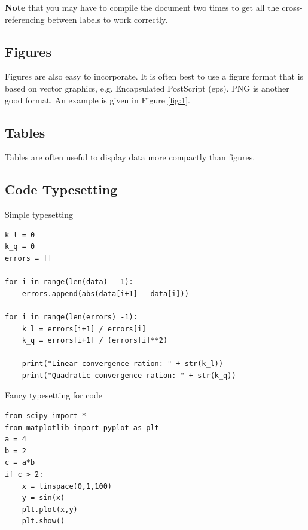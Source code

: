 \documentclass[12pt]{article}
\begin{document}
{\bf Note} that you may have to compile the document two times to get
all the cross-referencing between labels to work correctly.

\subsection{Figures}
Figures are also easy to incorporate. It is often best to use a figure
format that is based on vector graphics, e.g. Encapsulated PostScript
(eps). PNG is another good format.  An example is given in Figure \ref{fig:1}. 


\subsection{Tables}
Tables are often useful to display data more compactly than figures.


\subsection{Code Typesetting}

Simple typesetting
\begin{verbatim}
k_l = 0
k_q = 0
errors = []

for i in range(len(data) - 1):
    errors.append(abs(data[i+1] - data[i]))

for i in range(len(errors) -1):
    k_l = errors[i+1] / errors[i]
    k_q = errors[i+1] / (errors[i]**2)
        
    print("Linear convergence ration: " + str(k_l))
    print("Quadratic convergence ration: " + str(k_q))

\end{verbatim}


Fancy typesetting for code
\begin{lstlisting}
from scipy import *
from matplotlib import pyplot as plt
a = 4
b = 2
c = a*b
if c > 2:
    x = linspace(0,1,100)
    y = sin(x)
    plt.plot(x,y)
    plt.show()
\end{lstlisting}

%
%
\end{document}
